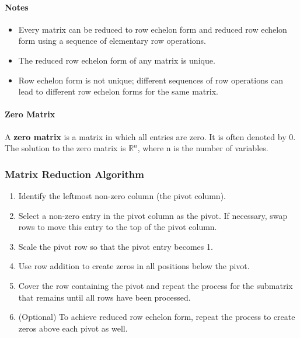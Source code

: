 \paragraph*{Notes}
\begin{itemize}
    \item Every matrix can be reduced to row echelon form and reduced row echelon form using a sequence of elementary row operations.
    \item The reduced row echelon form of any matrix is unique.
    \item Row echelon form is not unique; different sequences of row operations can lead to different row echelon forms for the same matrix.
\end{itemize}

\paragraph*{Zero Matrix} A \textbf{zero matrix} is a matrix in which all entries are zero. It is often denoted by $0$. The solution
to the zero matrix is $\mathbb{R}^n$, where n is the number of variables.

\subsubsection*{Matrix Reduction Algorithm}
\begin{enumerate}
    \item Identify the leftmost non-zero column (the pivot column).
    \item Select a non-zero entry in the pivot column as the pivot. If necessary, swap rows to move this entry to the top of the pivot column.
    \item Scale the pivot row so that the pivot entry becomes 1.
    \item Use row addition to create zeros in all positions below the pivot.
    \item Cover the row containing the pivot and repeat the process for the submatrix that remains until all rows have been processed.
    \item (Optional) To achieve reduced row echelon form, repeat the process to create zeros above each pivot as well.
\end{enumerate}


